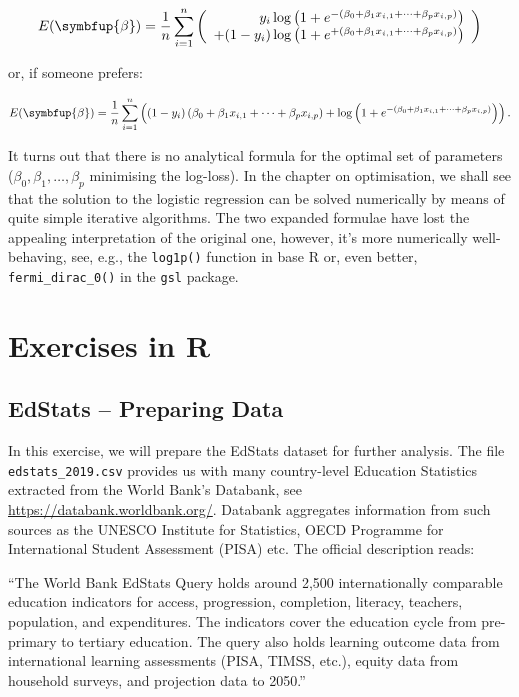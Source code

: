 \documentclass[10pt,b5paper,krantz1]{krantz}
\renewcommand{\boldsymbol}[1]{\symbfup{#1}}
\renewenvironment{quote}{\begin{VF}}{\end{VF}}
\begin{document}
\[
E(\boldsymbol\beta)=
\frac{1}{n}
\sum_{i=1}^n \left(
\begin{array}{r}
y_i \log \left(1+e^{-(\beta_0 + \beta_1 x_{i,1}+\dots+\beta_p x_{i,p})}\right)\\
+
(1-y_i) \log \left(1+e^{+(\beta_0 + \beta_1 x_{i,1}+\dots+\beta_p x_{i,p})}\right)
\end{array}
\right)
\]

or, if someone prefers:

\[
E(\boldsymbol\beta)=
\frac{1}{n}
\sum_{i=1}^n \left(
(1-y_i)\left(\beta_0 + \beta_1 x_{i,1}+\dots+\beta_p x_{i,p}\right)
+\log \left(1+e^{-(\beta_0 + \beta_1 x_{i,1}+\dots+\beta_p x_{i,p})}\right)
\right).
\]

It turns out that there is no analytical formula
for the optimal set of parameters (\(\beta_0,\beta_1,\dots,\beta_p\)
minimising the log-loss).
In the chapter on optimisation, we shall see that
the solution to the logistic regression can be solved numerically
by means of quite simple iterative algorithms.
The two expanded formulae have lost the appealing interpretation
of the original one, however, it's more numerically well-behaving,
see, e.g., the \texttt{log1p()} function in base R or, even better,
\texttt{fermi\_dirac\_0()} in the \texttt{gsl} package.

\hypertarget{exercises-in-r-2}{%
\section{Exercises in R}\label{exercises-in-r-2}}

\hypertarget{edstats-preparing-data}{%
\subsection{EdStats -- Preparing Data}\label{edstats-preparing-data}}

In this exercise, we will prepare the EdStats dataset
for further analysis.
The file \texttt{edstats\_2019.csv} provides us with many
country-level Education Statistics extracted from the World Bank's Databank,
see \url{https://databank.worldbank.org/}.
Databank aggregates information from such sources as
the UNESCO Institute for Statistics,
OECD Programme for International Student Assessment (PISA)
etc. The official description reads:

\begin{quote}
``The World Bank EdStats Query holds around 2,500 internationally comparable
education indicators for access, progression, completion, literacy, teachers,
population, and expenditures. The indicators cover the education cycle from
pre-primary to tertiary education. The query also holds learning outcome data
from international learning assessments (PISA, TIMSS, etc.), equity data
from household surveys, and projection data to 2050.''
\end{quote}
\end{document}
